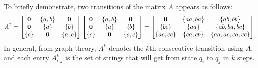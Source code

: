 \documentclass[12pt]{article}
\begin{document}
\begin{example}
  To briefly demonstrate, two transitions of the matrix \(A\) appears as
  follows:
  \begin{align*}
    A^2 =
      \begin{bmatrix}
        \mathbf{0} & \left\{a, b\right\} & \mathbf{0} \\
        \mathbf{0} & \left\{a\right\} & \left\{b\right\} \\
        \left\{c\right\} & \mathbf{0} & \left\{a, c\right\}
      \end{bmatrix} 
      \begin{bmatrix}
        \mathbf{0} & \left\{a, b\right\} & \mathbf{0} \\
        \mathbf{0} & \left\{a\right\} & \left\{b\right\} \\
        \left\{c\right\} & \mathbf{0} & \left\{a, c\right\}
      \end{bmatrix}
      =
      \begin{bmatrix}
        \mathbf{0} & \left\{aa, ba\right\} & \left\{ab, bb\right\} \\
        \left\{bc\right\} & \left\{aa\right\} & \left\{ab, ba, bc\right\} \\
        \left\{ac, cc\right\} & \left\{ca, cb\right\} & \left\{aa, ac, ca, cc\right\}
      \end{bmatrix}
  \end{align*}
  In general, from graph theory, \(A^k\) denotes the \(k\)th consecutive
  transition using \(A\),
  and each entry \(A^k _{i, j}\) is the set of strings that will
  get from state \(q_i\) to \(q_j\) in \(k\) steps.

\end{example}





\printbibliography
\end{document}
